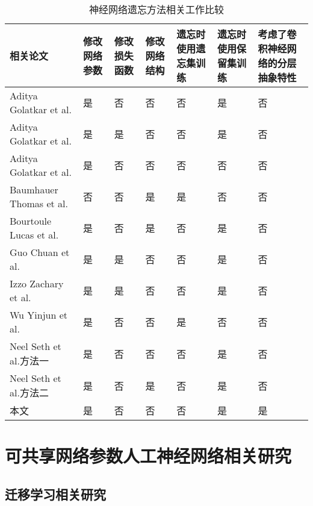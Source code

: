 \begin{table}
    \centering
    \caption{神经网络遗忘方法相关工作比较}
    \begin{tabular}{p{3cm}<{\centering}p{1cm}<{\centering}p{1cm}<{\centering}p{1cm}<{\centering}p{1.5cm}<{\centering}p{1.5cm}<{\centering}p{2cm}<{\centering}}
      \toprule
      相关论文  & 修改网络参数 & 修改损失函数  &修改网络结构&遗忘时使用遗忘集训练&遗忘时使用保留集训练&考虑了卷积神经网络的分层抽象特性\\
      \midrule

      Aditya Golatkar et al.\cite{Golatkar_2020_CVPR} &是&否&否&否&是&否 \\
      Aditya Golatkar et al.\cite{Golatkar_2021_CVPR} &是&是&否&否&是&否 \\
      Aditya Golatkar et al.\cite{10.1007/978-3-030-58526-6_23} &是&否&否&否&否&否 \\
      Baumhauer Thomas et al.\cite{2020arXiv200202730B} &否&否&是&是&否&否 \\
      Bourtoule Lucas et al.\cite{2019arXiv191203817B} &是&否&是&否&是&否 \\
      Guo Chuan et al.\cite{pmlr-v119-guo20c} &是&是&否&否&是&否 \\
      Izzo Zachary et al.\cite{pmlr-v130-izzo21a} &是&是&否&否&是&否 \\
      Wu Yinjun et al.\cite{pmlr-v119-wu20b} &是&否&否&是&否&否 \\
      Neel Seth et al.\cite{pmlr-v132-neel21a}方法一 &是&否&否&否&是&否 \\
      Neel Seth et al.\cite{pmlr-v132-neel21a}方法二 &是&否&是&否&是&否 \\
      本文 &是&否&否&否&是&是 \\

      \bottomrule
    \end{tabular}
    \label{tab:forget-methods}
\end{table}

\section{可共享网络参数人工神经网络相关研究}

\subsection{迁移学习相关研究}

